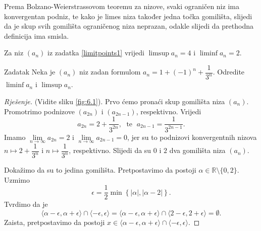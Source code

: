 Prema Bolzano-Weierstrassovom teoremu za nizove, svaki ograničen niz ima konvergentan podniz, te kako je limes niza također jedna točka gomilišta, slijedi da je skup svih gomilišta ograničenog niza neprazan, odakle slijedi da prethodna definicija ima smisla.

\begin{remark}
Za niz \((a_n)\) iz zadatka \ref{limitpoints1} vrijedi \(\limsup{a_n}=4\) i \(\liminf{a_n}=2\).
\end{remark}

\begin{exercise}{Zadatak}
\label{limitpoints2}
Neka je \((a_n)\) niz zadan formulom \(a_n=1+(-1)^n+\dfrac{1}{3^n}\). Odredite \(\liminf{a_n}\) i \(\limsup{a_n}\).
\end{exercise}
\begin{proof}[Rješenje]
(Vidite sliku \ref{fig:6.1}). Prvo ćemo pronaći skup gomilišta niza \((a_n)\). Promotrimo podnizove \((a_{2n})\) i \((a_{2n-1})\), respektivno. Vrijedi \[a_{2n}=2+\dfrac{1}{3^{2n}},\;\text{ te }\;a_{2n-1}=\dfrac{1}{3^{2n-1}}.\] 
Imamo \(\lim\limits_{n\to \infty}{a_{2n}}=2\) i \(\lim\limits_{n\to \infty}{a_{2n-1}}=0\), jer su to podnizovi konvergentnih nizova \(n\mapsto 2+\dfrac{1}{3^n}\) i \(n\mapsto \dfrac{1}{3^n}\), respektivno. Slijedi da su \(0\) i \(2\) dva gomilišta niza \((a_n)\). 

Dokažimo da su to jedina gomilišta. Pretpostavimo da postoji \(\alpha\in \mathbb{R}\setminus\{0, 2\}\). Uzmimo \[\epsilon=\dfrac{1}{2}\min\left\{|\alpha|, |\alpha-2|\right\}.\] 
Tvrdimo da je \[\langle \alpha-\epsilon,\alpha+\epsilon\rangle\cap\langle -\epsilon,\epsilon\rangle=\langle \alpha-\epsilon,\alpha+\epsilon\rangle\cap\langle 2-\epsilon,2+\epsilon\rangle=\emptyset.\] 
Zaista, pretpostavimo da postoji \(x\in \langle\alpha-\epsilon,\alpha+\epsilon\rangle\cap\langle -\epsilon,\epsilon\rangle\).


\end{proof}
